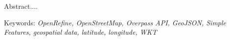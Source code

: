 \lipsum[1-3]

Abstract....\\
\newline

Keywords: \textit{OpenRefine, OpenStreetMap, Overpass API, GeoJSON, Simple Features, geospatial data, latitude, longitude, WKT}